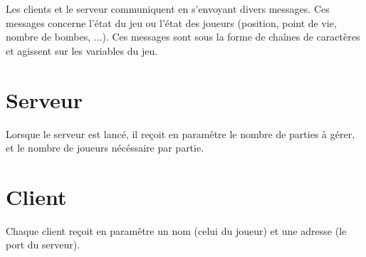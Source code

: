 	Les clients et le serveur communiquent en s'envoyant divers messages. Ces messages concerne l'état du jeu ou l'état des joueurs (position, point de vie, nombre de bombes, ...). Ces messages sont sous la forme de chaînes de caractères et agissent sur les variables du jeu.

\section*{Serveur}

Lorsque le serveur est lancé, il reçoit en paramêtre le nombre de parties à gérer, et le nombre de joueurs nécéssaire par partie. 

\section*{Client}

Chaque client reçoit en paramêtre un nom (celui du joueur) et une adresse (le port du serveur).
